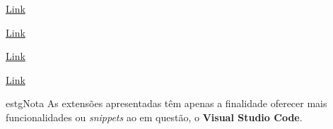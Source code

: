 \vspace{0.25cm}

\begin{minipage}[t]{0.5\textwidth}
	\centering

	\href{https://marketplace.visualstudio.com/items?itemName=formulahendry.auto-close-tag}{Link}
\end{minipage}
\begin{minipage}[t]{0.5\textwidth}
	\centering

	\href{https://marketplace.visualstudio.com/items?itemName=formulahendry.auto-rename-tag}{Link}
\end{minipage}

\vspace{0.25cm}

\begin{minipage}[t]{0.5\textwidth}
	\centering

	\href{https://marketplace.visualstudio.com/items?itemName=dbaeumer.vscode-eslint}{Link}
\end{minipage}
\begin{minipage}[t]{0.5\textwidth}
	\centering

	\href{https://marketplace.visualstudio.com/items?itemName=Syler.sass-indented}{Link}
\end{minipage}

\begin{mybox}{estg}{Nota}
	As extensões apresentadas têm apenas a finalidade oferecer mais funcionalidades ou \textit{snippets} ao  em questão, o \textbf{Visual Studio Code}.
\end{mybox}